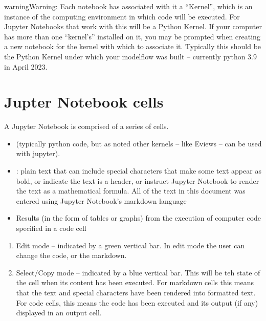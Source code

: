 \documentclass[letterpaper,10pt,english]{jupyterBook}
\begin{document}
\begin{sphinxadmonition}{warning}{Warning:}
\sphinxAtStartPar
Each notebook has associated with it a “Kernel”, which is an instance of the computing environment in which code will be executed. For Jupyter Notebooks that work with  this will be a Python Kernel. If your computer has more than one “kernel’s” installed on it, you may be prompted when creating a new notebook for the kernel with which to associate it.  Typically this should be the Python Kernel under which your modelflow was built – currently python 3.9 in April 2023.
\end{sphinxadmonition}


\section{Jupter Notebook cells}
\label{\detokenize{content/04_PythonEssentials/Intro_Jupyter_notebook:jupter-notebook-cells}}
\sphinxAtStartPar
A Jupyter Notebook is comprised of a series of cells.

\sphinxAtStartPar
{}
\begin{itemize}
\item {} 
\sphinxAtStartPar
{} (typically python code, but as noted other kernels – like Eviews – can be used with jupyter).

\item {} 
\sphinxAtStartPar
{}: plain text that can include special characters that make some text appear as bold, or indicate the text is a header, or instruct Jupyter Notebook to render the text as a mathematical formula.  All of the text in this document was entered using Jupyter Notebook’s markdown language

\item {} 
\sphinxAtStartPar
Results (in the form of tables or graphs) from the execution of computer code specified in a code cell

\end{itemize}

\sphinxAtStartPar
{}
\begin{enumerate}
%
\item {} 
\sphinxAtStartPar
Edit mode – indicated by a green vertical bar. In edit mode the user can change the code, or the markdown.

\item {} 
\sphinxAtStartPar
Select/Copy mode – indicated by a blue vertical bar.  This will be teh state of the cell when its content has been executed.  For markdown cells this means that the text and special characters have been rendered into formatted text.  For code cells, this means the code has been executed and its output (if any) displayed in an output cell.

\end{enumerate}
\end{document}
